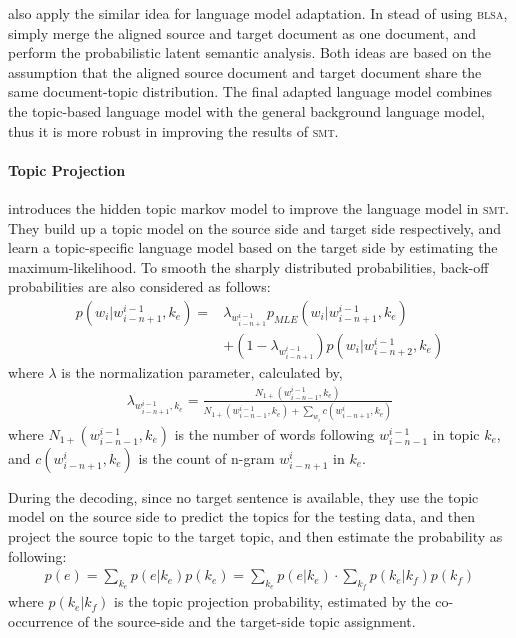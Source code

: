 \cite{Ruiz-2011} also apply the similar idea for language model
adaptation. In stead of using \textsc{blsa}, \cite{Ruiz-2011} simply
merge the aligned source and target document as one document, and
perform the probabilistic latent semantic analysis. Both ideas are
based on the assumption that the aligned source document and target
document share the same document-topic distribution. The final adapted
language model combines the topic-based language model with the
general background language model, thus it is more robust in improving
the results of \textsc{smt}.


\paragraph{Topic Projection}

\citet{Yu-2013} introduces the hidden topic markov model to improve
the language model in \textsc{smt}. They build up a topic model on the
source side and target side respectively, and learn a topic-specific
language model based on the target side by estimating the
maximum-likelihood. To smooth the sharply distributed probabilities,
back-off probabilities are also considered as follows:
\begin{align}
p(w_i | w^{i-1}_{i-n+1}, k_e) = &\lambda_{w^{i-1}_{i-n+1}} p_{MLE}(w_i|w^{i-1}_{i-n+1}, k_e) \\
&+ (1- \lambda_{w^{i-1}_{i-n+1}})p(w_i|w^{i-1}_{i-n+2}, k_e)
\end{align}
where $\lambda$ is the normalization parameter, calculated by,
\begin{align}
\lambda_{w^{i-1}_{i-n+1}, k_e} = \frac{N_{1+}(w^{i-1}_{i-n-1},
  k_e)}{N_{1+}(w^{i-1}_{i-n-1}, k_e) + \sum_{w_i}c(w^i_{i-n+1}, k_e)}
\end{align}
where $N_{1+}(w^{i-1}_{i-n-1}, k_e)$ is the number of words following
$w^{i-1}_{i-n-1}$ in topic $k_e$, and $c(w^i_{i-n+1}, k_e)$ is the
count of n-gram $w^i_{i-n+1}$ in $k_e$.

During the decoding, since no target sentence is available, they use
the topic model on the source side to predict the topics for the
testing data, and then project the source topic to the target topic,
and then estimate the probability as following:
\begin{align}
p(e) = \sum_{k_e} p(e|k_e) p(k_e) = \sum_{k_e} p(e|k_e) \cdot \sum_{k_f} p(k_e|k_f) p (k_f)
\end{align}
where $p(k_e|k_f)$ is the topic projection probability, estimated by
the co-occurrence of the source-side and the target-side topic
assignment.


